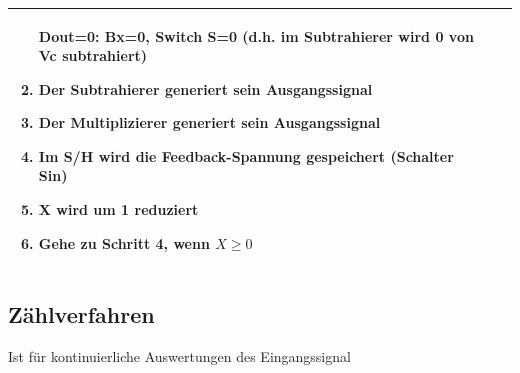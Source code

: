 \begin{longtable}{|l|l|l|}
\begin{minipage}{8cm}
\begin{enumerate}
  Dout=0: Bx=0, Switch S=0 (d.h. im Subtrahierer wird 0 von Vc
  subtrahiert)
  \item Der Subtrahierer generiert sein Ausgangssignal
  \item Der Multiplizierer generiert sein Ausgangssignal
  \item Im S/H wird die Feedback-Spannung gespeichert (Schalter Sin)
  \item X wird um 1 reduziert
  \item Gehe zu Schritt 4, wenn $X\geq0$
\end{enumerate}
\end{minipage}
\\
\hline
\end{longtable}



\subsection{Zählverfahren}
Ist für kontinuierliche Auswertungen des Eingangssignal
